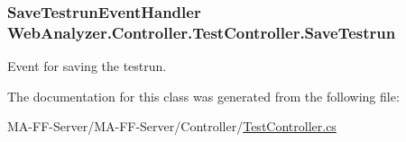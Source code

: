 \subsubsection[{Save\+Testrun}]{\setlength{\rightskip}{0pt plus 5cm}Save\+Testrun\+Event\+Handler Web\+Analyzer.\+Controller.\+Test\+Controller.\+Save\+Testrun}\label{class_web_analyzer_1_1_controller_1_1_test_controller_a45f8340dcea78391a3f58e5c7996d126}


Event for saving the testrun. 



The documentation for this class was generated from the following file\+:\begin{DoxyCompactItemize}
\item 
M\+A-\/\+F\+F-\/\+Server/\+M\+A-\/\+F\+F-\/\+Server/\+Controller/\hyperlink{_test_controller_8cs}{Test\+Controller.\+cs}\end{DoxyCompactItemize}
